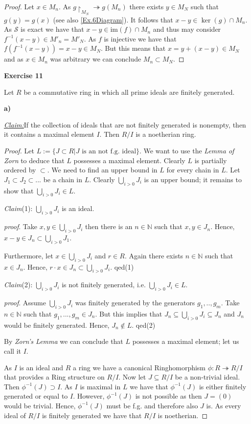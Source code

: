 \documentclass{article}
\newcommand{\contradiction}{\lightning}
\newcommand{\N}{\mathbb{N}}
\newcommand{\im}{\mathrm{im}}
\newcommand{\inv}[1]{{#1}^{-1}}
\newcommand{\claim}
{\underline{\textit{Claim:}}\hspace{0,2cm}}
\newcommand{\subclaim}[1]
{

	\vspace*{0,2cm}
	\textit{Claim}({#1}):
}
\newcommand{\subqed}[1]{\hfill\textsf{qed}({#1})}
\newcommand{\subproof}{

\noindent\textit{proof}.\hspace{0,1cm}
}
\newcommand{\aufgabe}[1]{
{
	\vspace*{0.5cm}
	\noindent\textsf{\textbf{Exercise #1}}
	\vspace*{0.2cm}

}
}
\newcommand{\teilaufgabe}[1]{
{       

	\noindent\hspace*{0,1 cm}\textbf{#1)}
}
}
\theoremstyle{definition}
\theoremstyle{plain}
\theoremstyle{remark}
\begin{document}
\begin{proof}
Let $x\in M_n$. As $g\restriction_{M_N} \twoheadrightarrow g(M_n)$ there exists $y\in M_N$ such that $g(y) = g(x)$ (see also \cref{Ex.6Diagram}). It follows that $x-y\in \ker(g)\cap M_n$. As $\mathcal{S}$ is exact we have that $x-y\in\im(f)\cap M_n$ and thus may consider $f^{-1}(x-y)\in M'_n = M'_N$. As $f$ is injective we have that $f(\inv{f}(x-y))= x-y \in M_N$. But this means that $x = y + (x-y) \in M_N$ and as $x\in M_n$ was arbitrary we can conclude $M_n\subset M_N$.
\end{proof}

\aufgabe{11}
Let $R$ be a commutative ring in which all prime ideals are finitely generated.
\teilaufgabe{a} \claim If the collection of ideals that are not finitely generated is nonempty, then it contains a maximal element $I$. Then $R/I$ is a noetherian ring.
\begin{proof}
	Let $L:=\{J\subset R | J \text{ is an not f.g. ideal}\}$. We want to use the \emph{Lemma of Zorn} to deduce that $L$ possesses a maximal element. Clearly $L$ is partially ordered by $\subset$. We need to find an upper bound in $L$ for every chain in $L$. Let $J_1\subset J_2 \subset ...$ be a chain in $L$. Clearly $\bigcup_{i>0}J_i$ is an upper bound; it remains to show that $\bigcup_{i>0}J_i\in L$.  
	\subclaim1 $\bigcup_{i>0}J_i$  is an ideal.
	\subproof Take $x,y\in \bigcup_{i>0}J_i$ then there is an $n\in \N$ such that $x,y\in J_n$. Hence, $x-y\in J_n \subset \bigcup_{i>0}J_1$.
	
	Furthermore, let $x\in \bigcup_{i>0}J_i$ and $r\in R$. Again there exists $n\in \N$ such that $x\in J_n$. Hence, $r\cdot x \in J_n\subset \bigcup_{i>0}J_i$. \subqed1
	\subclaim2 $\bigcup_{i>0}J_i$ is not finitely generated, i.e. $\bigcup_{i>0}J_i\in L$.
	\subproof Assume $\bigcup_{i>0}J_i$ was finitely generated by the generators $g_1,..,g_m$. Take $n\in\N$ such that $g_1,...,g_m \in J_n$. But this implies that $J_n\subseteq\bigcup_{i>0}J_i\subseteq J_n$ and $J_n$ would be finitely generated. Hence, $J_n\notin L$. \contradiction \subqed2

	By \emph{Zorn's Lemma} we can conclude that $L$ possesses a maximal element; let us call it $I$.

	As $I$ is an ideal and $R$ a ring we have a canonical Ringhomorphism $\phi:R\twoheadrightarrow R/I$ that provides a Ring structure on $R/I$.
	Now let $J\subseteq R/I$ be a non-trivial ideal. Then $\inv{\phi}(J) \supset I$. As $I$ is maximal in $L$ we have that $\inv{\phi}(J)$ is either finitely generated or equal to $I$. However, $\inv{\phi}(J)$ is not possible as then $J = (0)$ would be trivial. Hence, $\inv{\phi}(J)$ must be f.g. and therefore also $J$ is. 
	As every ideal of $R/I$ is finitely generated we have that $R/I$ is noetherian.
\end{proof}
\end{document}
